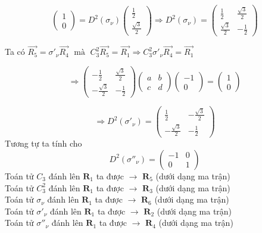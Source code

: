 \documentclass{article}
\begin{document}
\[
	\renewcommand{\arraystretch}{0.75}
	\begin{pmatrix}
		1 \\
		0
	\end{pmatrix}
	= D^2(\sigma_\nu)
	\begin{pmatrix}
		\frac{1}{2} \\
		\frac{\sqrt{3}}{2}
	\end{pmatrix}
	\Rightarrow  D^2(\sigma_\nu) =
	\begin{pmatrix}
		\frac{1}{2}        & \frac{\sqrt{3}}{2} \\
		\frac{\sqrt{3}}{2} & -\frac{1}{2}
	\end{pmatrix}
\]

Ta có $ \vec{R_5} = \sigma'_\nu \vec{R_4} \; \text{ mà }\; C_3^2 \vec{R_5} =
	\vec{R_1} \Rightarrow C_3^2 \sigma'_\nu \vec{R_4} = \vec{R_1}$

\[
	\renewcommand{\arraystretch}{0.75}
	\Rightarrow
	\begin{pmatrix}
		-\frac{1}{2}        & \frac{\sqrt{3}}{2} \\
		-\frac{\sqrt{3}}{2} & -\frac{1}{2}
	\end{pmatrix}
	\begin{pmatrix}
		a & b \\
		c & d
	\end{pmatrix}
	\begin{pmatrix}
		-1 \\
		0
	\end{pmatrix}
	=
	\begin{pmatrix}
		1 \\
		0
	\end{pmatrix}
\]

\[
	\renewcommand{\arraystretch}{0.75}
	\Rightarrow D^2\left(\sigma'_\nu\right) =
	\begin{pmatrix}
		\frac{1}{2}         & -\frac{\sqrt{3}}{2} \\
		-\frac{\sqrt{3}}{2} & -\frac{1}{2}
	\end{pmatrix}
\]
Tương tự ta tính cho
\[
	\renewcommand{\arraystretch}{0.75}
	D^2\left(\sigma''_\nu\right) =
	\begin{pmatrix}
		-1 & 0 \\
		0  & 1
	\end{pmatrix}
\]
\noindent Toán tử $C_3$ đánh lên $\textbf{R}_1$ ta được $\rightarrow$ $\textbf{R}_5$ (dưới dạng ma trận)\\
Toán tử $C_3^2$ đánh lên $\textbf{R}_1$ ta được $\rightarrow$ $\textbf{R}_3$ (dưới dạng ma trận)\\
Toán tử $\sigma_\nu$ đánh lên $\textbf{R}_1$ ta được $\rightarrow$ $\textbf{R}_6$ (dưới dạng ma trận)\\
Toán tử $\sigma'_\nu$ đánh lên $\textbf{R}_1$ ta được $\rightarrow$ $\textbf{R}_2$ (dưới dạng ma trận)\\
Toán tử $\sigma''_\nu$ đánh lên $\textbf{R}_1$ ta được $\rightarrow$ $\textbf{R}_4$ (dưới dạng ma trận)
\end{document}
